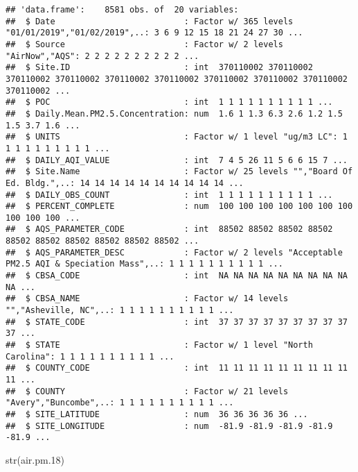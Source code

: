 \documentclass[
]{article}
\newenvironment{Shaded}{\begin{snugshade}}{\end{snugshade}}
\newcommand{\FloatTok}[1]{\textcolor[rgb]{0.00,0.00,0.81}{#1}}
\newcommand{\FunctionTok}[1]{\textcolor[rgb]{0.00,0.00,0.00}{#1}}
\newcommand{\NormalTok}[1]{#1}
\begin{document}
\begin{verbatim}
## 'data.frame':    8581 obs. of  20 variables:
##  $ Date                          : Factor w/ 365 levels "01/01/2019","01/02/2019",..: 3 6 9 12 15 18 21 24 27 30 ...
##  $ Source                        : Factor w/ 2 levels "AirNow","AQS": 2 2 2 2 2 2 2 2 2 2 ...
##  $ Site.ID                       : int  370110002 370110002 370110002 370110002 370110002 370110002 370110002 370110002 370110002 370110002 ...
##  $ POC                           : int  1 1 1 1 1 1 1 1 1 1 ...
##  $ Daily.Mean.PM2.5.Concentration: num  1.6 1 1.3 6.3 2.6 1.2 1.5 1.5 3.7 1.6 ...
##  $ UNITS                         : Factor w/ 1 level "ug/m3 LC": 1 1 1 1 1 1 1 1 1 1 ...
##  $ DAILY_AQI_VALUE               : int  7 4 5 26 11 5 6 6 15 7 ...
##  $ Site.Name                     : Factor w/ 25 levels "","Board Of Ed. Bldg.",..: 14 14 14 14 14 14 14 14 14 14 ...
##  $ DAILY_OBS_COUNT               : int  1 1 1 1 1 1 1 1 1 1 ...
##  $ PERCENT_COMPLETE              : num  100 100 100 100 100 100 100 100 100 100 ...
##  $ AQS_PARAMETER_CODE            : int  88502 88502 88502 88502 88502 88502 88502 88502 88502 88502 ...
##  $ AQS_PARAMETER_DESC            : Factor w/ 2 levels "Acceptable PM2.5 AQI & Speciation Mass",..: 1 1 1 1 1 1 1 1 1 1 ...
##  $ CBSA_CODE                     : int  NA NA NA NA NA NA NA NA NA NA ...
##  $ CBSA_NAME                     : Factor w/ 14 levels "","Asheville, NC",..: 1 1 1 1 1 1 1 1 1 1 ...
##  $ STATE_CODE                    : int  37 37 37 37 37 37 37 37 37 37 ...
##  $ STATE                         : Factor w/ 1 level "North Carolina": 1 1 1 1 1 1 1 1 1 1 ...
##  $ COUNTY_CODE                   : int  11 11 11 11 11 11 11 11 11 11 ...
##  $ COUNTY                        : Factor w/ 21 levels "Avery","Buncombe",..: 1 1 1 1 1 1 1 1 1 1 ...
##  $ SITE_LATITUDE                 : num  36 36 36 36 36 ...
##  $ SITE_LONGITUDE                : num  -81.9 -81.9 -81.9 -81.9 -81.9 ...
\end{verbatim}

\begin{Shaded}
\begin{Highlighting}[]
\FunctionTok{str}\NormalTok{(air.pm}\FloatTok{.18}\NormalTok{)}
\end{Highlighting}
\end{Shaded}
\end{document}
